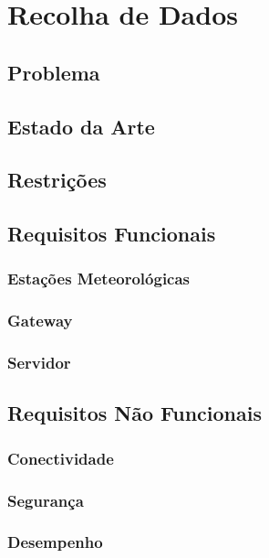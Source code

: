 \chapter{Recolha de Dados}
\section{Problema}
\section{Estado da Arte}
\section{Restrições}

\section{Requisitos Funcionais}
	\subsection{Estações Meteorológicas}
	\subsection{Gateway}
	\subsection{Servidor}

\section{Requisitos Não Funcionais}
	\subsection{Conectividade}
	\subsection{Segurança}
	\subsection{Desempenho}